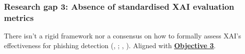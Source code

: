 
\subsubsection*{Research gap 3: Absence of standardised XAI evaluation metrics}\label{research-gap-3}
There isn't a rigid framework nor a consensus on how to formally assess XAI's effectiveness for phishing detection (\citeauthor{reddy2023explainable}, \citeyear{reddy2023explainable}; \citeauthor{shendkar2024enhancing}, \citeyear{shendkar2024enhancing}). Aligned with \hyperref[objective-3]{\uline{\textbf{Objective 3}}}.

